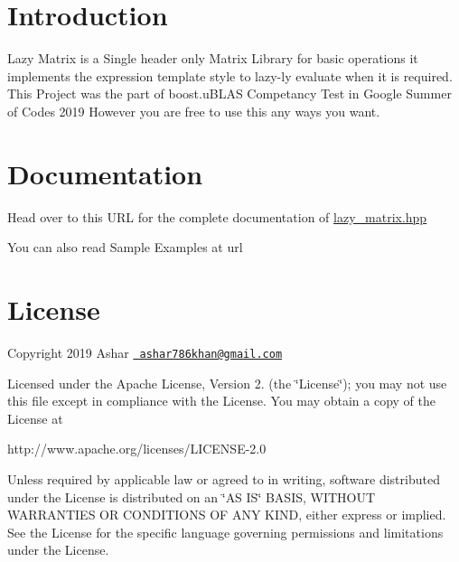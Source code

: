 \hypertarget{index_intro_sec}{}\section{Introduction}\label{index_intro_sec}
Lazy Matrix is a Single header only Matrix Library for basic operations it implements the expression template style to lazy-\/ly evaluate when it is required. This Project was the part of boost.\+u\+B\+L\+AS Competancy Test in Google Summer of Codes 2019 However you are free to use this any ways you want.\hypertarget{index_install_sec}{}\section{Documentation}\label{index_install_sec}
Head over to this {\ttfamily U\+RL} for the complete documentation of {\ttfamily \mbox{\hyperlink{lazy__matrix_8hpp_source}{lazy\+\_\+matrix.\+hpp}}}

You can also read Sample Examples at {\ttfamily url}\hypertarget{index_license}{}\section{License}\label{index_license}
Copyright 2019 Ashar \href{mailto:ashar786khan@gmail.com}{\texttt{ ashar786khan@gmail.\+com}}

Licensed under the Apache License, Version 2. (the \char`\"{}\+License\char`\"{}); you may not use this file except in compliance with the License. You may obtain a copy of the License at \begin{DoxyVerb}http://www.apache.org/licenses/LICENSE-2.0
\end{DoxyVerb}


Unless required by applicable law or agreed to in writing, software distributed under the License is distributed on an \char`\"{}\+A\+S I\+S\char`\"{} B\+A\+S\+IS, W\+I\+T\+H\+O\+UT W\+A\+R\+R\+A\+N\+T\+I\+ES OR C\+O\+N\+D\+I\+T\+I\+O\+NS OF A\+NY K\+I\+ND, either express or implied. See the License for the specific language governing permissions and limitations under the License. 